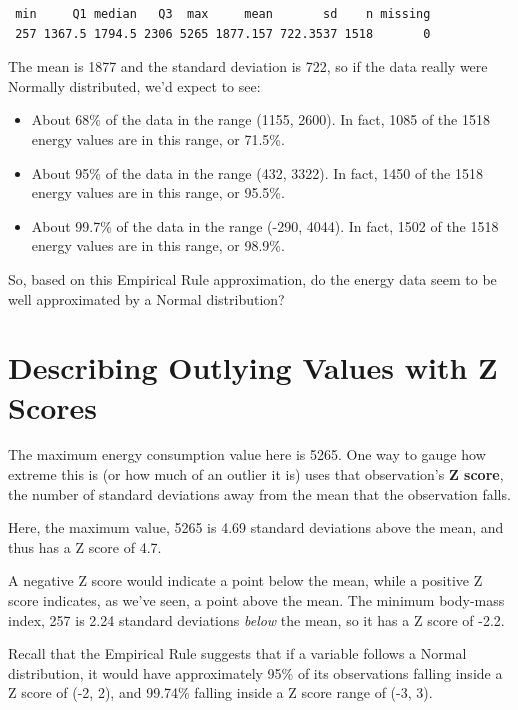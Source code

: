 \documentclass[
]{book}
\providecommand{\tightlist}{%
  \setlength{\itemsep}{0pt}\setlength{\parskip}{0pt}}
\begin{document}
\begin{verbatim}
 min     Q1 median   Q3  max     mean       sd    n missing
 257 1367.5 1794.5 2306 5265 1877.157 722.3537 1518       0
\end{verbatim}

The mean is 1877 and the standard deviation is 722, so if the data really were Normally distributed, we'd expect to see:

\begin{itemize}
\tightlist
\item
  About 68\% of the data in the range (1155, 2600). In fact, 1085 of the 1518 energy values are in this range, or 71.5\%.
\item
  About 95\% of the data in the range (432, 3322). In fact, 1450 of the 1518 energy values are in this range, or 95.5\%.
\item
  About 99.7\% of the data in the range (-290, 4044). In fact, 1502 of the 1518 energy values are in this range, or 98.9\%.
\end{itemize}

So, based on this Empirical Rule approximation, do the energy data seem to be well approximated by a Normal distribution?

\hypertarget{describing-outlying-values-with-z-scores}{%
\section{Describing Outlying Values with Z Scores}\label{describing-outlying-values-with-z-scores}}

The maximum energy consumption value here is 5265. One way to gauge how extreme this is (or how much of an outlier it is) uses that observation's \textbf{Z score}, the number of standard deviations away from the mean that the observation falls.

Here, the maximum value, 5265 is 4.69 standard deviations above the mean, and thus has a Z score of 4.7.

A negative Z score would indicate a point below the mean, while a positive Z score indicates, as we've seen, a point above the mean. The minimum body-mass index, 257 is 2.24 standard deviations \emph{below} the mean, so it has a Z score of -2.2.

Recall that the Empirical Rule suggests that if a variable follows a Normal distribution, it would have approximately 95\% of its observations falling inside a Z score of (-2, 2), and 99.74\% falling inside a Z score range of (-3, 3).
\end{document}
